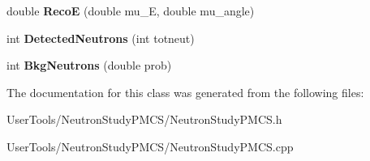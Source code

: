 \begin{DoxyCompactItemize}
\item 
\hypertarget{classNeutronStudyPMCS_a87bfadcdde1434cd4aaa66ff9968a121}{
double {\bfseries RecoE} (double mu\_\-E, double mu\_\-angle)}
\label{classNeutronStudyPMCS_a87bfadcdde1434cd4aaa66ff9968a121}

\item 
\hypertarget{classNeutronStudyPMCS_aadac422e432f47ceae16a87a8d2679bb}{
int {\bfseries DetectedNeutrons} (int totneut)}
\label{classNeutronStudyPMCS_aadac422e432f47ceae16a87a8d2679bb}

\item 
\hypertarget{classNeutronStudyPMCS_a73c188dfa2d0465729cc3e7c2d68a1bd}{
int {\bfseries BkgNeutrons} (double prob)}
\label{classNeutronStudyPMCS_a73c188dfa2d0465729cc3e7c2d68a1bd}

\end{DoxyCompactItemize}


The documentation for this class was generated from the following files:\begin{DoxyCompactItemize}
\item 
UserTools/NeutronStudyPMCS/NeutronStudyPMCS.h\item 
UserTools/NeutronStudyPMCS/NeutronStudyPMCS.cpp\end{DoxyCompactItemize}
